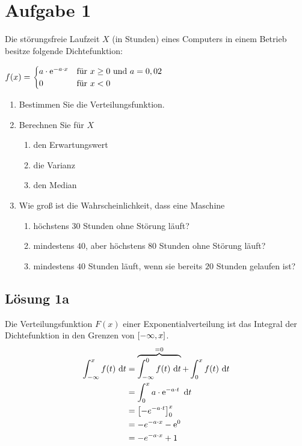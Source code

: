 \documentclass[main.tex]{subfiles}
\begin{document}
\section{Aufgabe 1}
Die störungsfreie Laufzeit $X$ (in Stunden) eines Computers in einem Betrieb besitze folgende Dichtefunktion:
\begin{center}
$f(x)=\begin{cases}
		a \cdot \operatorname{\mathrm{e}}^{-a \cdot x}	& \text{für } x \geq 0 \text{ und } a = 0,02\\
		0												& \text{für } x < 0
\end{cases}$
\end{center}
\begin{enumerate}
\item Bestimmen Sie die Verteilungsfunktion.
\item Berechnen Sie für $X$
\begin{enumerate}
\item den Erwartungswert
\item die Varianz
\item den Median
\end{enumerate}
\item Wie groß ist die Wahrscheinlichkeit, dass eine Maschine
\begin{enumerate}
\item höchstens $30$ Stunden ohne Störung läuft?
\item mindestens $40$, aber höchstens $80$ Stunden ohne Störung läuft?
\item mindestens $40$ Stunden läuft, wenn sie bereits $20$ Stunden gelaufen ist?
\end{enumerate}
\end{enumerate}

\subsection{Lösung 1a}

Die Verteilungsfunktion \(F(x)\) einer Exponentialverteilung ist das Integral der Dichtefunktion in den Grenzen von $[-\infty, x]$.
$$\begin{aligned}
	\int_{-\infty}^{x} f(t) ~\mathrm{d}t &= \overbrace{\int_{-\infty}^{0} f(t) ~\mathrm{d}t}^{=0} + \int_{0}^{x} f(t) ~\mathrm{d}t \\
	&= \int_{0}^{x} a\cdot \operatorname{\mathrm{e}}^{-a\cdot t} ~\mathrm{d}t \\
	&= \left[ -e^{-a\cdot t} \right]_{0}^{x} \\
	&= -e^{-a\cdot x} -\operatorname{\mathrm{e}}^0 \\
	&= -e^{-a\cdot x} + 1 \\
\end{aligned}$$
\end{document}
